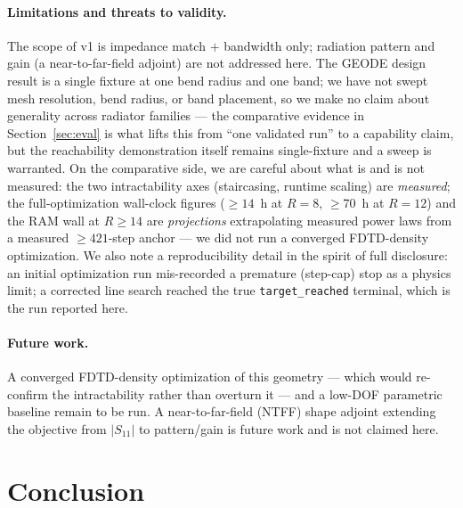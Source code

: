 \documentclass{anvil-paper}
\begin{document}
\paragraph{Limitations and threats to validity.}
The scope of v1 is impedance match $+$ bandwidth only; radiation pattern and
gain (a near-to-far-field adjoint) are not addressed here. The GEODE design
result is a single fixture at one bend radius and one band; we have not swept
mesh resolution, bend radius, or band placement, so we make no claim about
generality across radiator families --- the comparative evidence in
Section~\ref{sec:eval} is what lifts this from ``one validated run'' to a
capability claim, but the reachability demonstration itself remains
single-fixture and a sweep is warranted. On the comparative side, we are careful
about what is and is not measured: the two intractability axes (staircasing,
runtime scaling) are \emph{measured}; the full-optimization wall-clock figures
($\ge\!14$~h at $R=8$, $\ge\!70$~h at $R=12$) and the RAM wall at $R\!\ge\!14$
are \emph{projections} extrapolating measured power laws from a measured
$\ge\!421$-step anchor --- we did not run a converged FDTD-density optimization.
We also note a reproducibility detail in the spirit of full disclosure: an
initial optimization run mis-recorded a premature (step-cap) stop as a physics
limit; a corrected line search reached the true \texttt{target\_reached}
terminal, which is the run reported here.

\paragraph{Future work.}
A converged FDTD-density optimization of this geometry --- which would re-confirm
the intractability rather than overturn it --- and a low-DOF parametric baseline
remain to be run. A near-to-far-field (NTFF) shape adjoint extending the
objective from $|S_{11}|$ to pattern/gain is future work and is not claimed here.

\section{Conclusion}
\label{sec:conclusion}
\end{document}
